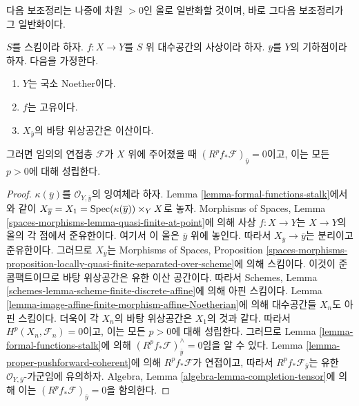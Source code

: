 \noindent
다음 보조정리는 나중에 차원 $ > 0$인 올로 일반화할 것이며, 바로
그다음 보조정리가 그 일반화이다.

\begin{lemma}
\label{lemma-higher-direct-images-zero-finite-fibre}
$S$를 스킴이라 하자. $f : X \to Y$를 $S$ 위 대수공간의 사상이라
하자. $\overline{y}$를 $Y$의 기하점이라 하자. 다음을 가정한다.
\begin{enumerate}
\item $Y$는 국소 Noether이다.
\item $f$는 고유이다.
\item $X_{\overline{y}}$의 바탕 위상공간은 이산이다.
\end{enumerate}
그러면 임의의 연접층 $\mathcal{F}$가 $X$ 위에 주어졌을 때
$(R^pf_*\mathcal{F})_{\overline{y}} = 0$이고, 이는 모든 $p > 0$에
대해 성립한다.
\end{lemma}

\begin{proof}
$\kappa(\overline{y})$를 $\mathcal{O}_{Y, \overline{y}}$의 잉여체라
하자. Lemma \ref{lemma-formal-functions-stalk}에서와 같이
$X_{\overline{y}} = X_1 = \mathop{\mathrm{Spec}}(\kappa(\overline{y})) \times_Y X$로
놓자. Morphisms of Spaces, Lemma
\ref{spaces-morphisms-lemma-quasi-finite-at-point}에 의해 사상
$f : X \to Y$는 $X \to Y$의 올의 각 점에서 준유한이다. 여기서 이
올은 $\overline{y}$ 위에 놓인다. 따라서
$X_{\overline{y}} \to \overline{y}$는
분리이고 준유한이다. 그러므로 $X_{\overline{y}}$는 Morphisms of
Spaces, Proposition
\ref{spaces-morphisms-proposition-locally-quasi-finite-separated-over-scheme}에
의해 스킴이다. 이것이 준콤팩트이므로 바탕 위상공간은 유한 이산
공간이다. 따라서 Schemes, Lemma
\ref{schemes-lemma-scheme-finite-discrete-affine}에 의해 아핀 스킴이다.
Lemma \ref{lemma-image-affine-finite-morphism-affine-Noetherian}에 의해
대수공간들 $X_n$도 아핀 스킴이다. 더욱이
각 $X_n$의 바탕 위상공간은 $X_1$의 것과 같다. 따라서
$H^p(X_n, \mathcal{F}_n) = 0$이고, 이는 모든 $p > 0$에 대해
성립한다. 그러므로 Lemma \ref{lemma-formal-functions-stalk}에 의해
$(R^pf_*\mathcal{F})_{\overline{y}}^\wedge = 0$임을 알 수 있다.
Lemma \ref{lemma-proper-pushforward-coherent}에 의해
$R^pf_*\mathcal{F}$가 연접이고, 따라서
$R^pf_*\mathcal{F}_{\overline{y}}$는 유한
$\mathcal{O}_{Y, \overline{y}}$-가군임에 유의하자. Algebra, Lemma
\ref{algebra-lemma-completion-tensor}에 의해 이는
$(R^pf_*\mathcal{F})_{\overline{y}} = 0$을 함의한다.
\end{proof}


